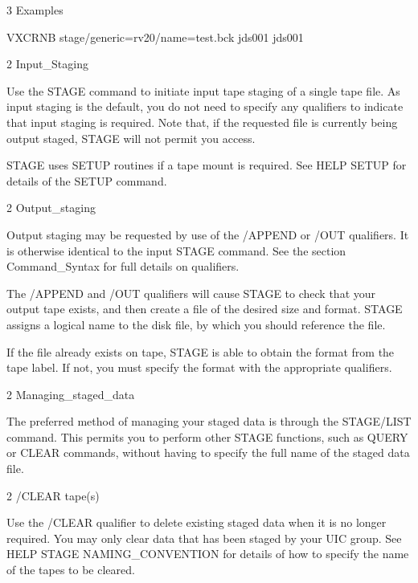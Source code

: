 \begin{XMP}
3 Examples

VXCRNB       stage/generic=rv20/name=test.bck jds001 jds001

2 Input_Staging

Use the STAGE command to initiate input tape staging of a single tape file.
As input staging is the default, you do not need to specify any qualifiers
to indicate that input staging is required. Note that, if the requested
file is currently being output staged, STAGE will not permit you access.

STAGE uses SETUP routines if a tape mount is required. See HELP SETUP for
details of the SETUP command.

2 Output_staging

Output staging may be requested by use of the /APPEND or /OUT qualifiers.
It is otherwise identical to the input STAGE command.
See the section Command_Syntax for full details on qualifiers.

The /APPEND and /OUT qualifiers will cause STAGE to check that your
output tape exists, and then create a file of the desired size and format.
STAGE assigns a logical name to the disk file, by which you should reference
the file.

If the file already exists on tape, STAGE is able to obtain the format
from the tape label. If not, you must specify the format with the
appropriate qualifiers.

2 Managing_staged_data

The preferred method of managing your staged data is through the STAGE/LIST
command. This permits you to perform other STAGE functions, such as QUERY
or CLEAR commands, without having to specify the full name of the staged
data file.

2 /CLEAR tape(s)

  Use the /CLEAR qualifier to delete existing staged data when
it is no longer required. You may only clear data that has been
staged by your UIC group. See HELP STAGE NAMING_CONVENTION for
details of how to specify the name of the tapes to be cleared.


\end{XMP}
